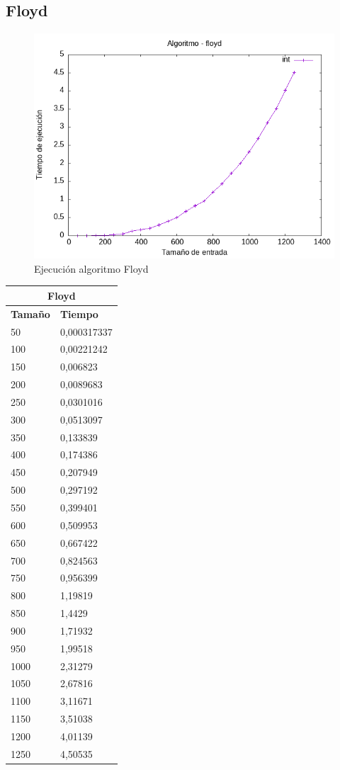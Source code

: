 \documentclass[11pt]{article}
\begin{document}
\subsection*{Floyd}
\begin{figure}[H]
    \centering
        \includegraphics[width=0.5\linewidth]{assets/Img/floydint.png}
        \caption{Ejecución algoritmo Floyd}
        \label{fig:floyd}
\end{figure}
\begin{table}[!ht]
    \centering
    \small
    \begin{tabular}{|l|l|}
    \hline
        \multicolumn{2}{|c|}{\cellcolor{blue!20}Floyd} \\ \hline
        \textbf{Tamaño} & \textbf{Tiempo} \\ \hline
        50 & 0,000317337 \\ \hline
        100 & 0,00221242 \\ \hline
        150 & 0,006823 \\ \hline
        200 & 0,0089683 \\ \hline
        250 & 0,0301016 \\ \hline
        300 & 0,0513097 \\ \hline
        350 & 0,133839 \\ \hline
        400 & 0,174386 \\ \hline
        450 & 0,207949 \\ \hline
        500 & 0,297192 \\ \hline
        550 & 0,399401 \\ \hline
        600 & 0,509953 \\ \hline
        650 & 0,667422 \\ \hline
        700 & 0,824563 \\ \hline
        750 & 0,956399 \\ \hline
        800 & 1,19819 \\ \hline
        850 & 1,4429 \\ \hline
        900 & 1,71932 \\ \hline
        950 & 1,99518 \\ \hline
        1000 & 2,31279 \\ \hline
        1050 & 2,67816 \\ \hline
        1100 & 3,11671 \\ \hline
        1150 & 3,51038 \\ \hline
        1200 & 4,01139 \\ \hline
        1250 & 4,50535 \\ \hline
    \end{tabular}
\end{table}
\end{document}
